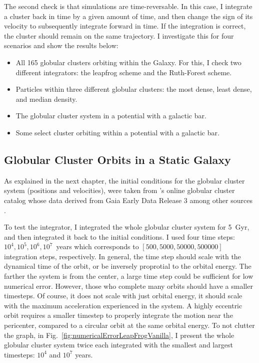     The second check is that simulations are time-reversable. In this case, I integrate a cluster back in time by a given amount of time, and then change the sign of its velocity to subsequently integrate forward in time. If the integration is correct, the cluster should remain on the same trajectory. I investigate this for four scenarios and show the results below: 
    \begin{itemize}
        \item All 165 globular clusters orbiting within the Galaxy. For this, I check two different integrators: the leapfrog scheme and the Ruth-Forest scheme. 
        \item Particles within three different globular clusters: the most dense, least dense, and median density.
        \item The globular cluster system in a potential with a galactic bar. 
        \item Some select cluster orbiting within a potential with a galactic bar. 
    \end{itemize}

    \subsection{Globular Cluster Orbits in a Static Galaxy}

        As explained in the next chapter, the initial conditions for the globular cluster system (positions and velocities), were taken from \citet{2018MNRAS.478.1520B}'s online globular cluster catalog whose data derived from Gaia Early Data Release 3 among other sources \citep{2021MNRAS.505.5957B,2021A&A...649A...1G,2023A&A...674A...1G}. 

        To test the integrator, I integrated the whole globular cluster system for 5~Gyr, and then integrated it back to the initial conditions. I used four time steps: $10^4,10^5,10^6,10^7$~years which corresponds to $\left[500,5000,50000,500000\right]$ integration steps, respectively. In general, the time step should scale with the dynamical time of the orbit, or be inversely proprotial to the orbital energy. The farther the system is from the center, a large time step could be sufficient for low numerical error. However, those who complete many orbits should have a smaller timesteps. Of course, it does not scale with just orbital energy, it should scale with the maximum acceleration experienced in the system. A highly eccentric orbit requires a smaller timestep to properly integrate the motion near the pericenter, compared to a circular orbit at the same orbital energy. To not clutter the graph, in Fig.~\ref{fig:numericalErrorLeapFrogVanilla}, I present the whole globular cluster system twice each integrated with the smallest and largest timesteps: $10^4$ and $10^7$ years. 

